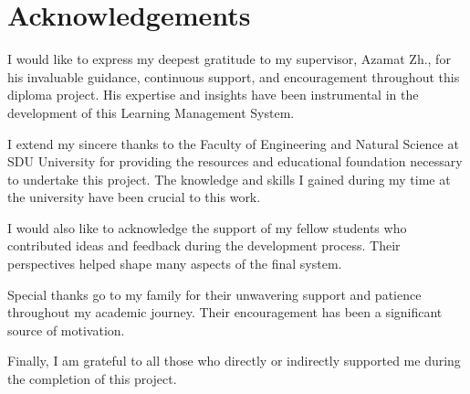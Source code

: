 \newpage
\section*{Acknowledgements}

I would like to express my deepest gratitude to my supervisor, Azamat Zh., for his invaluable guidance, continuous support, and encouragement throughout this diploma project. His expertise and insights have been instrumental in the development of this Learning Management System.

I extend my sincere thanks to the Faculty of Engineering and Natural Science at SDU University for providing the resources and educational foundation necessary to undertake this project. The knowledge and skills I gained during my time at the university have been crucial to this work.

I would also like to acknowledge the support of my fellow students who contributed ideas and feedback during the development process. Their perspectives helped shape many aspects of the final system.

Special thanks go to my family for their unwavering support and patience throughout my academic journey. Their encouragement has been a significant source of motivation.

Finally, I am grateful to all those who directly or indirectly supported me during the completion of this project.